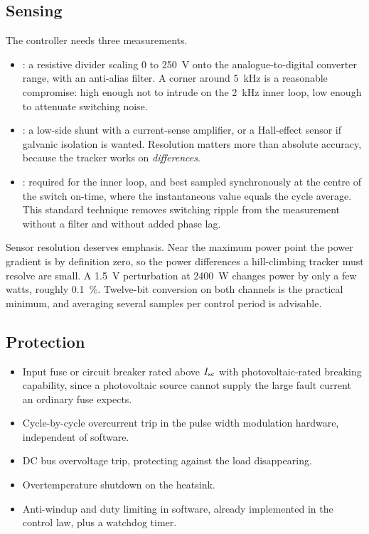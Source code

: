 \subsection{Sensing}

The controller needs three measurements.

\begin{itemize}[leftmargin=1.4em]
  \item {}: a resistive divider scaling \SI{0}{} to
        \SI{250}{\volt} onto the analogue-to-digital converter range, with an
        anti-alias filter. A corner around \SI{5}{\kilo\hertz} is a reasonable
        compromise: high enough not to intrude on the \SI{2}{\kilo\hertz} inner
        loop, low enough to attenuate switching noise.
  \item {}: a low-side shunt with a current-sense amplifier, or a
        Hall-effect sensor if galvanic isolation is wanted. Resolution matters
        more than absolute accuracy, because the tracker works on
        \emph{differences}.
  \item {}: required for the inner loop, and best sampled
        synchronously at the centre of the switch on-time, where the
        instantaneous value equals the cycle average. This standard technique
        removes switching ripple from the measurement without a filter and
        without added phase lag.
\end{itemize}

Sensor resolution deserves emphasis. Near the maximum power point the power
gradient is by definition zero, so the power differences a hill-climbing tracker
must resolve are small. A \SI{1.5}{\volt} perturbation at
\SI{2400}{\watt} changes power by only a few watts, roughly
\SI{0.1}{\percent}. Twelve-bit conversion on both channels is the practical
minimum, and averaging several samples per control period is advisable.

\subsection{Protection}

\begin{itemize}[leftmargin=1.4em]
  \item Input fuse or circuit breaker rated above $I_{\mathrm{sc}}$ with photovoltaic-rated
        breaking capability, since a photovoltaic source cannot supply the large
        fault current an ordinary fuse expects.
  \item Cycle-by-cycle overcurrent trip in the pulse width modulation hardware,
        independent of software.
  \item DC bus overvoltage trip, protecting against the load disappearing.
  \item Overtemperature shutdown on the heatsink.
  \item Anti-windup and duty limiting in software, already implemented in the
        control law, plus a watchdog timer.
\end{itemize}

